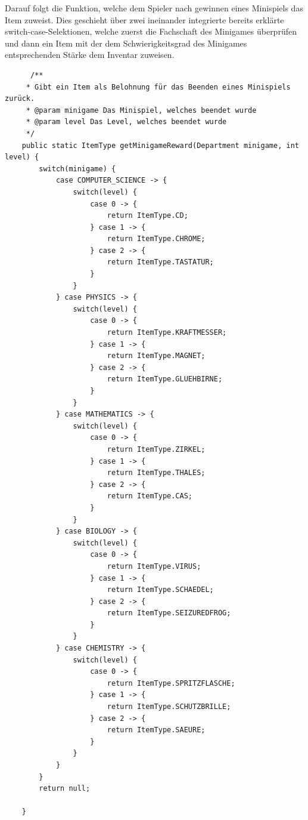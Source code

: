 Darauf folgt die Funktion, welche dem Spieler nach gewinnen eines Minispiels das Item zuweist.
Dies geschieht über zwei ineinander integrierte bereits erklärte switch-case-Selektionen, welche zuerst die Fachschaft des Minigames überprüfen und dann ein Item mit der dem Schwierigkeitsgrad des Minigames entsprechenden Stärke dem Inventar zuweisen.
\\
\begin{lstlisting}
      /**
     * Gibt ein Item als Belohnung für das Beenden eines Minispiels zurück.
     * @param minigame Das Minispiel, welches beendet wurde
     * @param level Das Level, welches beendet wurde
     */
    public static ItemType getMinigameReward(Department minigame, int level) {
        switch(minigame) {
            case COMPUTER_SCIENCE -> {
                switch(level) {
                    case 0 -> {
                        return ItemType.CD;
                    } case 1 -> {
                        return ItemType.CHROME;
                    } case 2 -> {
                        return ItemType.TASTATUR;
                    }
                }
            } case PHYSICS -> {
                switch(level) {
                    case 0 -> {
                        return ItemType.KRAFTMESSER;
                    } case 1 -> {
                        return ItemType.MAGNET;
                    } case 2 -> {
                        return ItemType.GLUEHBIRNE;
                    }
                }
            } case MATHEMATICS -> {
                switch(level) {
                    case 0 -> {
                        return ItemType.ZIRKEL;
                    } case 1 -> {
                        return ItemType.THALES;
                    } case 2 -> {
                        return ItemType.CAS;
                    }
                }
            } case BIOLOGY -> {
                switch(level) {
                    case 0 -> {
                        return ItemType.VIRUS;
                    } case 1 -> {
                        return ItemType.SCHAEDEL;
                    } case 2 -> {
                        return ItemType.SEIZUREDFROG;
                    }
                }
            } case CHEMISTRY -> {
                switch(level) {
                    case 0 -> {
                        return ItemType.SPRITZFLASCHE;
                    } case 1 -> {
                        return ItemType.SCHUTZBRILLE;
                    } case 2 -> {
                        return ItemType.SAEURE;
                    }
                }
            }  
        }
        return null;
        
    }
\end{lstlisting}

